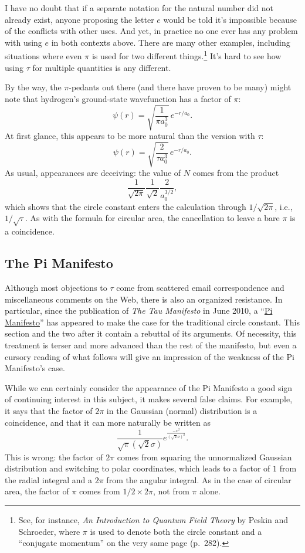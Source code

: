 I have no doubt that if a separate notation for the natural number did not already exist, anyone proposing the letter $e$ would be told it's impossible because of the conflicts with other uses. And yet, in practice no one ever has any problem with using $e$ in both contexts above.
There are many other examples, including situations where even $\pi$ is used for two different things.\footnote{See, for instance, \emph{An Introduction to Quantum Field Theory} by Peskin and Schroeder, where $\pi$ is used to denote both the circle constant and a ``conjugate momentum'' on the very same page (p.~282).} It's hard to see how using $\tau$ for multiple quantities is any different.

By the way, the $\pi$-pedants out there (and there have proven to be many) might note that hydrogen's ground-state wavefunction has a factor of $\pi$:
\[
\psi(r) = \sqrt{\frac{1}{\pi a_0^3}}\,e^{-r/a_0}.
\]
At first glance, this appears to be more natural than the version with $\tau$:
\[
\psi(r) = \sqrt{\frac{2}{\tau a_0^3}}\,e^{-r/a_0}.
\]
As usual, appearances are deceiving: the value of $N$ comes from the product
\[
\frac{1}{\sqrt{2\pi}} \frac{1}{\sqrt{2}} \frac{2}{a_0^{3/2}},
\]
which shows that the circle constant enters the calculation through $1/\sqrt{2\pi}$, i.e., $1/\sqrt{\tau}$. As with the formula for circular area, the cancellation to leave a bare $\pi$ is a coincidence.


  \subsection{The Pi Manifesto} %
  \label{sec:the_pi_manifesto_a_rebuttal}

Although most objections to $\tau$ come from scattered email correspondence and miscellaneous comments on the Web, there is also an organized resistance. In particular, since the publication of \emph{The Tau Manifesto} in June 2010, a ``\href{http://www.thepimanifesto.com/}{Pi Manifesto}'' has appeared to make the case for the traditional circle constant. This section and the two after it contain a rebuttal of its arguments. Of necessity, this treatment is terser and more advanced than the rest of the manifesto, but even a cursory reading of what follows will give an impression of the weakness of the Pi Manifesto's case.

While we can certainly consider the appearance of the Pi Manifesto a good sign of continuing interest in this subject, it makes several false claims. For example, it says that the factor of $2\pi$ in the Gaussian (normal) distribution is a coincidence, and that it can more naturally be written as
\[
\frac{1}{\sqrt\pi(\sqrt 2\sigma)}e^{\frac{-x^2}{(\sqrt 2\sigma)^2}}.
\]
This is wrong: the factor of $2\pi$ comes from squaring the unnormalized Gaussian distribution and switching to polar coordinates, which leads to a factor of $1$ from
the radial integral and a $2\pi$ from the angular integral. As in the case of circular area, the factor
of $\pi$ comes from $1/2\times 2\pi$, not from $\pi$ alone.

